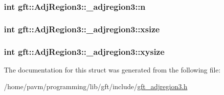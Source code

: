 \hypertarget{structgft_1_1AdjRegion3_1_1__adjregion3_abc20e7d7d2e211de9a4e467854c5e18d}{
\subsubsection[{n}]{\setlength{\rightskip}{0pt plus 5cm}int gft\-::\-Adj\-Region3\-::\-\_\-adjregion3\-::n}}\label{structgft_1_1AdjRegion3_1_1__adjregion3_abc20e7d7d2e211de9a4e467854c5e18d}
\hypertarget{structgft_1_1AdjRegion3_1_1__adjregion3_a4037356e2aa308226792442cbc1f7754}{
\subsubsection[{xsize}]{\setlength{\rightskip}{0pt plus 5cm}int gft\-::\-Adj\-Region3\-::\-\_\-adjregion3\-::xsize}}\label{structgft_1_1AdjRegion3_1_1__adjregion3_a4037356e2aa308226792442cbc1f7754}
\hypertarget{structgft_1_1AdjRegion3_1_1__adjregion3_ad70bcfe7793b3d3468b3360339f1a1ff}{
\subsubsection[{xysize}]{\setlength{\rightskip}{0pt plus 5cm}int gft\-::\-Adj\-Region3\-::\-\_\-adjregion3\-::xysize}}\label{structgft_1_1AdjRegion3_1_1__adjregion3_ad70bcfe7793b3d3468b3360339f1a1ff}


The documentation for this struct was generated from the following file\-:\begin{DoxyCompactItemize}
\item 
/home/pavm/programming/lib/gft/include/\hyperlink{gft__adjregion3_8h}{gft\-\_\-adjregion3.\-h}\end{DoxyCompactItemize}
